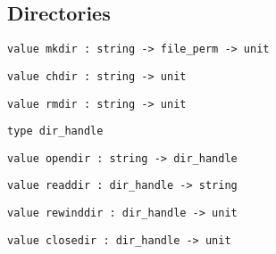 \subsection*{Directories }\begin{verbatim}
value mkdir : string -> file_perm -> unit
\end{verbatim}
%
\begin{comment}
 Create a directory with the given permissions. 
\end{comment}
\begin{verbatim}
value chdir : string -> unit
\end{verbatim}
%
\begin{comment}
 Change the process working directory. 
\end{comment}
\begin{verbatim}
value rmdir : string -> unit
\end{verbatim}
%
\begin{comment}
 Remove an empty directory. 
\end{comment}
\begin{verbatim}
type dir_handle
\end{verbatim}
\begin{comment}
 The type of descriptors over opened directories. 
\end{comment}
\begin{verbatim}
value opendir : string -> dir_handle
\end{verbatim}
%
\begin{comment}
 Open a descriptor on a directory 
\end{comment}
\begin{verbatim}
value readdir : dir_handle -> string
\end{verbatim}
%
\begin{comment}
 Return the next entry in a directory 
\end{comment}
\begin{verbatim}
value rewinddir : dir_handle -> unit
\end{verbatim}
%
\begin{comment}
 Reposition the descriptor to the beginning of the directory 
\end{comment}
\begin{verbatim}
value closedir : dir_handle -> unit
\end{verbatim}
%
\begin{comment}
 Close a directory descriptor. 
\end{comment}

